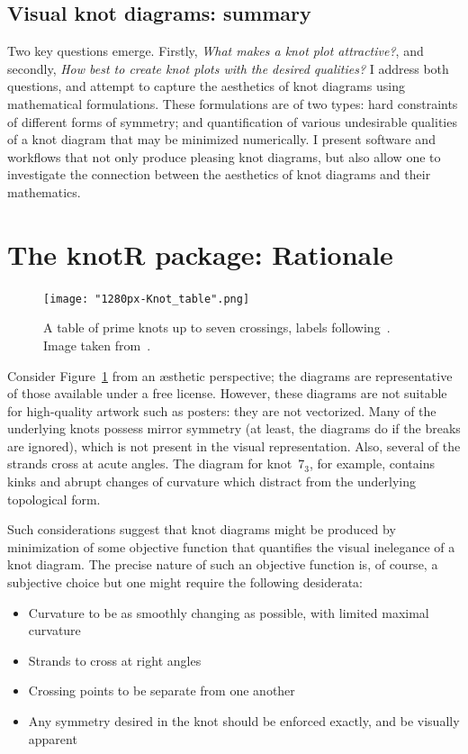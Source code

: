\documentclass{birkjour}
\theoremstyle{definition}
\theoremstyle{remark}
\numberwithin{equation}{section}
\begin{document}
\subsection{Visual knot diagrams: summary}

Two key questions emerge.  Firstly, {\em What makes a knot plot
  attractive?}, and secondly, {\em How best to create knot plots with
  the desired qualities?}  I address both questions, and attempt to
capture the aesthetics of knot diagrams using mathematical
formulations.  These formulations are of two types: hard constraints
of different forms of symmetry; and quantification of various
undesirable qualities of a knot diagram that may be minimized
numerically.  I present software and workflows that not only produce
pleasing knot diagrams, but also allow one to investigate the
connection between the aesthetics of knot diagrams and their
mathematics.

\section{The knotR package: Rationale}

\begin{figure}[h]
  \centering
  \texttt{[image: "1280px-Knot\_table".png]}  %
  \caption{A table of prime knots up \label{knot_table} to seven
    crossings, labels following~\cite{alexander1926}.  Image taken
    from~\cite{wikipedia_knot_theory}.}
\end{figure}

Consider Figure~\ref{knot_table} from an \ae sthetic perspective; the
diagrams are representative of those available under a free license.
However, these diagrams are not suitable for high-quality artwork such
as posters: they are not vectorized.  Many of the underlying knots
possess mirror symmetry (at least, the diagrams do if the breaks
are ignored), which is not present in the visual representation.
Also, several of the strands cross at acute angles.  The diagram for
knot~$7_3$, for example, contains kinks and abrupt changes of
curvature which distract from the underlying topological form.

Such considerations suggest that knot diagrams might be produced by
minimization of some objective function that quantifies the visual
inelegance of a knot diagram.  The precise nature of such an objective
function is, of course, a subjective choice but one might require the
following desiderata:

\begin{itemize}
\item Curvature to be as smoothly changing as possible, with limited maximal curvature
\item Strands to cross at right angles
\item Crossing points to be separate from one another
\item Any symmetry desired in the knot should be enforced exactly, and be visually apparent
\end{itemize}
\end{document}
